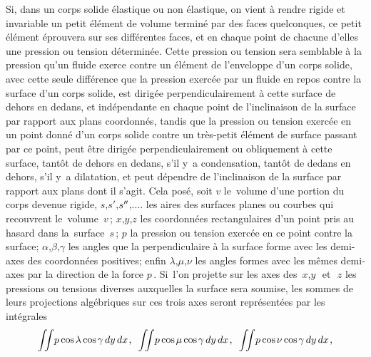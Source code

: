 \documentclass[11pt, twoside, leqno]{article}
\newcommand\cosine{\operatorname{cos} \hspace{-0.1ex}}
\begin{document}
Si, dans un corps solide élastique ou non élastique, on vient à rendre rigide et invariable un petit élément de volume terminé par des faces quelconques, ce petit élément éprouvera sur ses différentes faces, et en chaque point de chacune d'elles une pression ou tension déterminée. Cette pression ou tension sera semblable à la pression qu'un fluide exerce contre un élément de l'enveloppe d'un corps solide, avec cette seule différence que la pression exercée par un fluide en repos contre la surface d'un corps solide, est dirigée perpendiculairement à cette surface de dehors en dedans, et indépendante en chaque point de l'inclinaison de la surface par rapport aux plans coordonnés, tandis que la pression ou tension exercée en un point donné d'un corps solide contre un très-petit élément de surface passant par ce point, peut être dirigée perpendiculairement ou obliquement à cette surface, tantôt de dehors en dedans, s'il y~a condensation, tantôt de dedans en dehors, s'il y~a dilatation, et peut dépendre de l'inclinaison de la surface par rapport aux plans dont il s'agit. Cela posé, soit
\;$v$\; le~volume d'une portion du corps devenue rigide,
\hbox{\;$s$,\:$s'$,\:$s'\kern-0.2ex'$,\:.\hspace{.1ex}.\hspace{.1ex}.\hspace{.1ex}.\;} les aires des surfaces planes ou courbes qui recouvrent le~volume~\;$v$\,;\hspace{.4ex}
\;$x$,\:$y$,\:$z$\; les coordonnées rectangulaires d'un point pris au hasard dans la~surface~\;$s$\,;\hspace{.4ex}
\;$p$\; la pression ou tension exercée en ce point contre la surface;\hspace{.2ex}
\hbox{\;$\alpha$,\:$\beta$,\:$\gamma$\;} les angles que la perpendiculaire à la surface forme avec les demi-axes des coordonnées positives;
enfin \hbox{\;$\lambda$,\:$\mu$,\:$\nu$\;} les angles formes avec les mêmes demi-axes par la direction de la force \;$p$\,.\hspace{.5ex}
Si~l'on projette sur les axes des~\hbox{\;$x$,\:$y$\, et \,$z$\;} les pressions ou tensions diverses auxquelles la surface sera soumise, les sommes de leurs projections algébriques sur ces trois axes seront représentées par les intégrales
\begin{equation}\label{integrales.1}
\displaystyle\iint \! p \cosine \lambda \cosine \gamma \, dy \, dx \hspace{.2ex} \text{,} \hspace{.5em}
\displaystyle\iint \! p \cosine \mu \cosine \gamma \, dy \, dx \hspace{.2ex} \text{,} \hspace{.5em}
\displaystyle\iint \! p \cosine \nu \cosine \gamma \, dy \, dx \hspace{.2ex} \text{,}
\end{equation}
\end{document}
